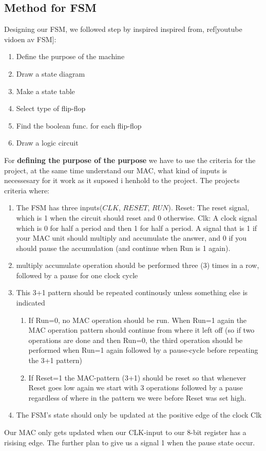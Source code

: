 \subsection{Method for FSM}
Designing our FSM, we followed step by inspired inspired from, ref[youtube vidoen av FSM]:
\begin{enumerate}
    \item Define the purpose of the machine
    \item Draw a state diagram
    \item Make a state table
    \item Select type of flip-flop
    \item Find the boolean func. for each flip-flop
    \item Draw a logic circuit
\end{enumerate}
For \textbf{defining the purpose of the purpose} we have to use the criteria for the project, at the same time understand our MAC, what kind of inputs is necessesary for it work as it suposed i henhold to the project. The projects criteria where:
\begin{enumerate}
    \item The FSM has three inputs($CLK$, $RESET$, $RUN$). Reset: The reset signal, which is 1 when the circuit should reset and 0 otherwise. Clk: A clock signal which is 0 for half a period and then 1 for half a period. A signal that is 1 if your MAC unit should multiply and accumulate the answer,
    and 0 if you should pause the accumulation (and continue when Run is 1 again).
    \item multiply accumulate operation should be performed three (3) times in a row,
    followed by a pause for one clock cycle
    \item This 3+1 pattern should be repeated continously unless something else is indicated
    \begin{enumerate}
        \item If Run=0, no MAC operation should be run. When Run=1 again the
        MAC operation pattern should continue from where it left off (so if two operations are done and
        then Run=0, the third operation should be performed when Run=1 again followed by a pause-cycle
        before repeating the 3+1 pattern)
        \item If Reset=1 the MAC-pattern (3+1) should be reset so that
        whenever Reset goes low again we start with 3 operations followed by a pause regardless of where
        in the pattern we were before Reset was set high.
    \end{enumerate}
    \item The FSM’s state should only be updated at the positive edge of the clock Clk
\end{enumerate}
Our MAC only gets updated when our CLK-input to our 8-bit register has a risising edge. The further plan to give us a signal 1 when the pause state occur.

